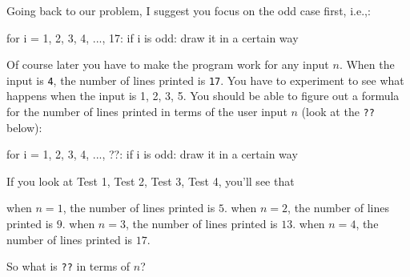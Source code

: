 Going back to our problem,
I suggest you focus on the odd case first, i.e.,:
{\small
\begin{console}
for i = 1, 2, 3, 4, ..., 17:
    if i is odd:
        draw it in a certain way
\end{console}
}
Of course later you have to make the program work for any input $n$.
When the input is \verb!4!, the number of lines printed is \verb!17!.
You have to experiment to see what happens when the input is 1, 2, 3, 5.
You should be able to figure out a formula for the number of lines
printed in terms of the user input $n$ (look at the \verb!??! below):
{\small
\begin{console}
for i = 1, 2, 3, 4, ..., ??:
    if i is odd:
        draw it in a certain way
\end{console}
}
If you look at Test 1, Test 2, Test 3, Test 4, you'll see that
\begin{tightlist}
  \li when $n = 1$, the number of lines printed is $5$.
  \li when $n = 2$, the number of lines printed is $9$.
  \li when $n = 3$, the number of lines printed is $13$.
  \li when $n = 4$, the number of lines printed is $17$.
\end{tightlist}
So what is \verb!??! in terms of $n$?

